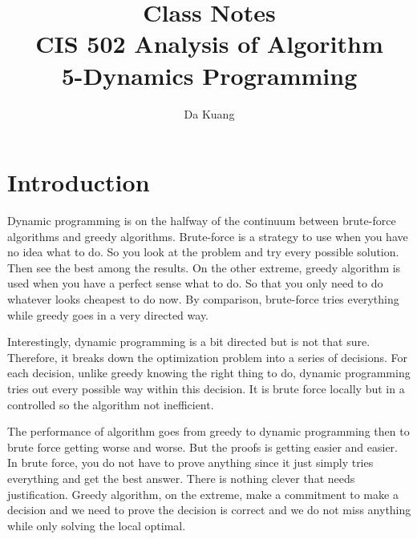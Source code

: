\documentclass[en,hazy,blue,screen,14pt]{elegantnote}
\title{Class Notes\\CIS 502 Analysis of Algorithm\\5-Dynamics Programming}
\author{Da Kuang}
\institute{University of Pennsylvania}
\date{}
\begin{document}
\maketitle
\newpage
% 
\section{Introduction}
Dynamic programming is on the halfway of the continuum between brute-force algorithms and greedy algorithms. Brute-force is a strategy to use when you have no idea what to do. So you look at the problem and try every possible solution. Then see the best among the results. On the other extreme, greedy algorithm is used when you have a perfect sense what to do. So that you only need to do whatever looks cheapest to do now. By comparison, brute-force tries everything while greedy goes in a very directed way.

Interestingly, dynamic programming is a bit directed but is not that sure. Therefore, it breaks down the optimization problem into a series of decisions. For each decision, unlike greedy knowing the right thing to do, dynamic programming tries out every possible way within this decision. It is brute force locally but in a controlled so the algorithm not inefficient.

The performance of algorithm goes from greedy to dynamic programming then to brute force getting worse and worse. But the proofs is getting easier and easier. In brute force, you do not have to prove anything since it just simply tries everything and get the best answer. There is nothing clever that needs justification. Greedy algorithm, on the extreme, make a commitment to make a decision and we need to prove the decision is correct and we do not miss anything while only solving the local optimal.
\end{document}
